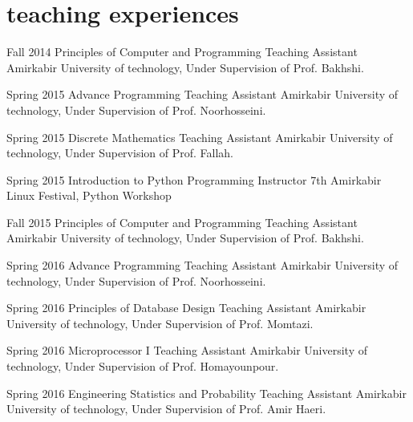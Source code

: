 \documentclass[]{friggeri-cv} %
\begin{document}

\section{teaching experiences}

\begin{entrylist}

\entry
{Fall 2014}
{Principles of Computer and Programming}
{Teaching Assistant}
{Amirkabir University of technology, Under Supervision of Prof. Bakhshi.}


\entry
{Spring 2015}
{Advance Programming}
{Teaching Assistant}
{Amirkabir University of technology, Under Supervision of Prof. Noorhosseini.}


\entry
{Spring 2015}
{Discrete Mathematics}
{Teaching Assistant}
{Amirkabir University of technology, Under Supervision of Prof. Fallah.}


\entry
{Spring 2015}
{Introduction to Python Programming}
{Instructor}
{7th Amirkabir Linux Festival, Python Workshop}


\entry
{Fall 2015}
{Principles of Computer and Programming}
{Teaching Assistant}
{Amirkabir University of technology, Under Supervision of Prof. Bakhshi.}


\entry
{Spring 2016}
{Advance Programming}
{Teaching Assistant}
{Amirkabir University of technology, Under Supervision of Prof. Noorhosseini.}


\entry
{Spring 2016}
{Principles of Database Design}
{Teaching Assistant}
{Amirkabir University of technology, Under Supervision of Prof. Momtazi.}


\entry
{Spring 2016}
{Microprocessor I}
{Teaching Assistant}
{Amirkabir University of technology, Under Supervision of Prof. Homayounpour.}


\entry
{Spring 2016}
{Engineering Statistics and Probability}
{Teaching Assistant}
{Amirkabir University of technology, Under Supervision of Prof. Amir Haeri.}



\end{entrylist}
\end{document}

